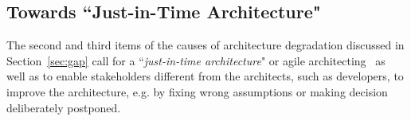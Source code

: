 %



\subsection{Towards ``Just-in-Time Architecture"}

The second and third items of the causes of architecture degradation discussed in Section~\ref{sec:gap} 
call for a ``{\em just-in-time architecture}" or agile architecting~\cite{shahrokni2016organic}  as well as to enable stakeholders different from the architects, such as developers, to improve the architecture, e.g. by fixing wrong assumptions or making decision deliberately postponed.

